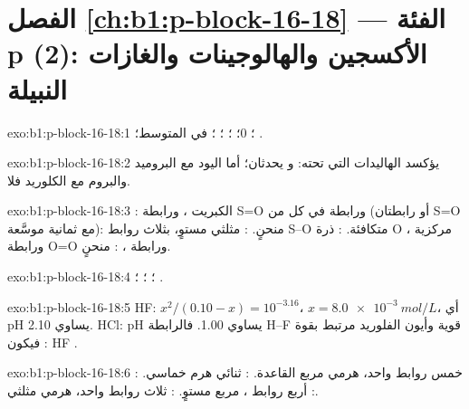 \section*{الفصل \ref{ch:b1:p-block-16-18} --- الفئة p (2): الأكسجين والهالوجينات والغازات النبيلة}

\begin{solution}{exo:b1:p-block-16-18:1}
 ؛  0؛  ؛  ؛ 
؛   في المتوسط؛  .
\end{solution}

\begin{solution}{exo:b1:p-block-16-18:2}
 يؤكسد الهاليدات التي تحته: 
و يحدثان؛ أما اليود مع البروميد والبروم مع
الكلوريد فلا.
\end{solution}

\begin{solution}{exo:b1:p-block-16-18:3}
: الكبريت ، ورابطة S=O ورابطة  في كل من  (أو رابطتان S=O مع ثمانية موسَّعة): منحنٍ.
: مثلثي مستوٍ، بثلاث روابط S--O متكافئة. : ذرة O مركزية
، ورابطة O=O ورابطة ، : منحنٍ.
\end{solution}

\begin{solution}{exo:b1:p-block-16-18:4}
؛ ؛
؛ .
\end{solution}

\begin{solution}{exo:b1:p-block-16-18:5}
HF: $x^2/(0.10 - x) = 10^{-3.16}$، $x = \qty{8.0e-3}{mol/L}$، أي pH يساوي 2.10. HCl:
pH يساوي 1.00. فالرابطة H--F قوية وأيون الفلوريد مرتبط بقوة : فيكون HF .
\end{solution}

\begin{solution}{exo:b1:p-block-16-18:6}
: خمس روابط  واحد، هرمي مربع القاعدة. :
ثنائي هرم خماسي. : أربع روابط ، مربع
مستوٍ. : ثلاث روابط  واحد، هرمي مثلثي.
\end{solution}

